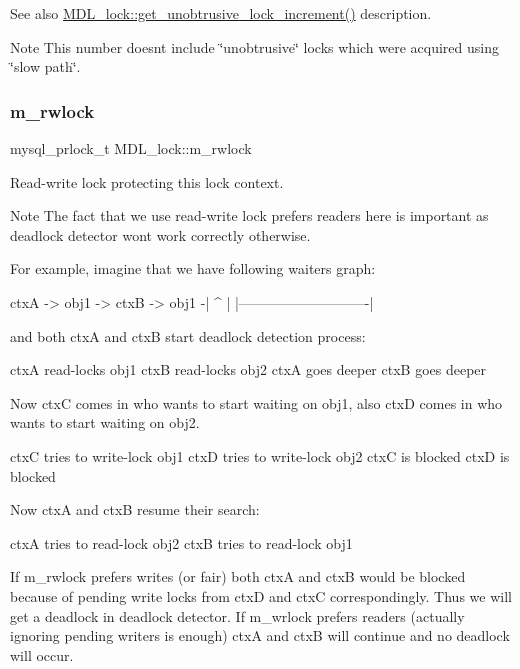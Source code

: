 \begin{DoxySeeAlso}{See also}
\mbox{\hyperlink{classMDL__lock_aa8424d2f478663117e7ac5e435840342}{M\+D\+L\+\_\+lock\+::get\+\_\+unobtrusive\+\_\+lock\+\_\+increment()}} description.
\end{DoxySeeAlso}
\begin{DoxyNote}{Note}
This number doesn\textquotesingle{}t include \char`\"{}unobtrusive\char`\"{} locks which were acquired using \char`\"{}slow path\char`\"{}. 
\end{DoxyNote}
\mbox{\label{classMDL__lock_a1308b4506d8cb6d754b4f173e3aa4962}} 
\subsubsection{\texorpdfstring{m\+\_\+rwlock}{m\_rwlock}}
{\footnotesize\ttfamily mysql\+\_\+prlock\+\_\+t M\+D\+L\+\_\+lock\+::m\+\_\+rwlock}

Read-\/write lock protecting this lock context.

\begin{DoxyNote}{Note}
The fact that we use read-\/write lock prefers readers here is important as deadlock detector won\textquotesingle{}t work correctly otherwise.
\end{DoxyNote}
For example, imagine that we have following waiters graph\+: \begin{DoxyVerb}         ctxA -> obj1 -> ctxB -> obj1 -|
          ^                            |
          |----------------------------|
\end{DoxyVerb}


and both ctxA and ctxB start deadlock detection process\+:

ctxA read-\/locks obj1 ctxB read-\/locks obj2 ctxA goes deeper ctxB goes deeper

Now ctxC comes in who wants to start waiting on obj1, also ctxD comes in who wants to start waiting on obj2.

ctxC tries to write-\/lock obj1 ctxD tries to write-\/lock obj2 ctxC is blocked ctxD is blocked

Now ctxA and ctxB resume their search\+:

ctxA tries to read-\/lock obj2 ctxB tries to read-\/lock obj1

If m\+\_\+rwlock prefers writes (or fair) both ctxA and ctxB would be blocked because of pending write locks from ctxD and ctxC correspondingly. Thus we will get a deadlock in deadlock detector. If m\+\_\+wrlock prefers readers (actually ignoring pending writers is enough) ctxA and ctxB will continue and no deadlock will occur. \mbox{\label{classMDL__lock_aed7a092b4b9aa426597f599feb6bb19b}} 
